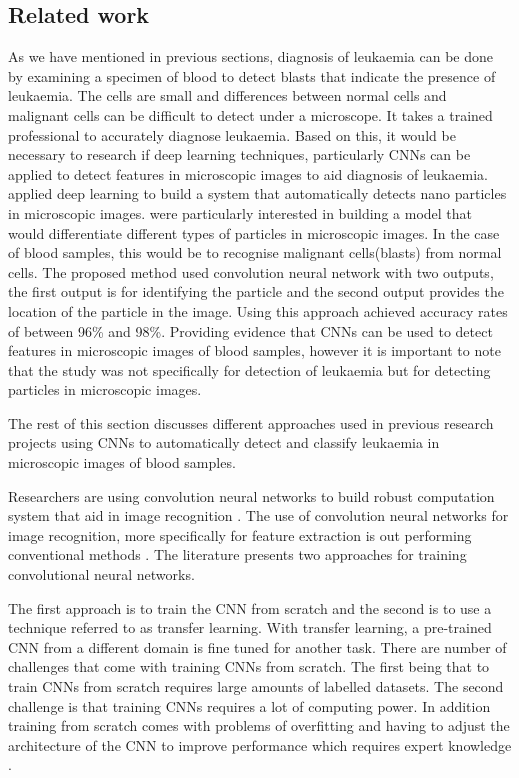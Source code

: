\documentclass[a4paper,11pt]{article}
\begin{document}
\subsection{Related work}
\label{relatedWork}
As we have mentioned in previous sections, diagnosis of leukaemia can be done by examining a specimen of blood to detect blasts that indicate the presence of leukaemia. The cells are small and differences between normal cells and malignant cells can be difficult to detect under a microscope. It takes a trained professional to accurately diagnose leukaemia. Based on this, it would be necessary to research if deep learning techniques, particularly CNNs can be applied to detect features in microscopic images to aid  diagnosis of leukaemia. \cite{Ayse} applied deep learning to build a system that automatically detects nano particles in microscopic images. \cite{Ayse} were particularly interested in building a model that would differentiate different types of particles in microscopic images. In the case of blood samples, this would be to recognise malignant cells(blasts) from normal cells. The proposed method used convolution neural network with two outputs, the first output is for identifying the particle and the second output provides the location of the particle in the image. Using this approach \cite{Ayse} achieved accuracy rates of between 96\% and 98\%. Providing evidence that CNNs can be used to detect features in microscopic images of blood samples, however it is important to note that the study was not specifically for detection of leukaemia but for detecting particles in microscopic images. 

The rest of this section discusses different approaches used in previous research projects using CNNs to automatically detect and classify leukaemia in microscopic images of blood samples.

Researchers are using convolution neural networks to build robust computation system that aid in image recognition \citep{Luis}. The use of convolution neural networks for image recognition, more specifically for feature extraction is out performing conventional methods \citep{Luis}. The literature presents two approaches for training convolutional neural networks.

The first approach is  to train the CNN from scratch and the second is to use a technique referred to as transfer learning. With transfer learning, a pre-trained CNN from a different domain is fine tuned for another task. There are  number of challenges that come with training CNNs from scratch. The first being that to train CNNs from scratch requires large amounts of labelled datasets. The second challenge is that training CNNs requires a lot of computing power. In addition training from scratch comes  with problems of overfitting and having to adjust the architecture of the CNN to improve performance  which requires expert knowledge \citep{IEEETransactions}.
\end{document}
